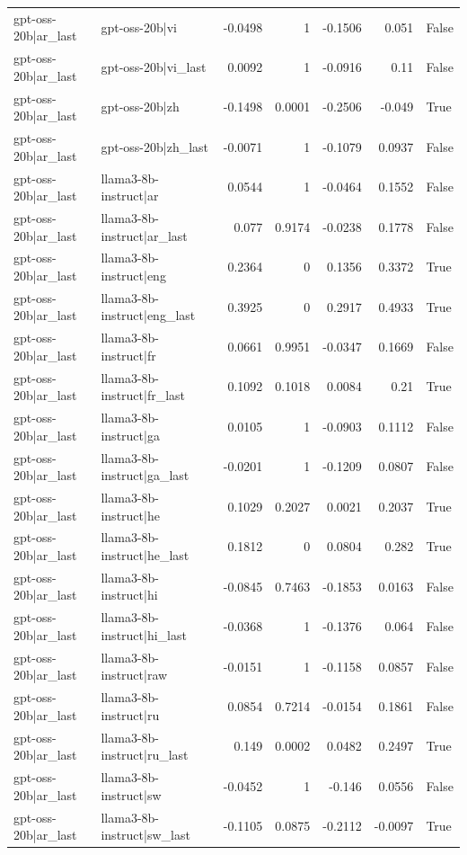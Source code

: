 \begin{table}
\begin{tabular}{l l r r r r l}
gpt-oss-20b|ar_last & gpt-oss-20b|vi & -0.0498 & 1 & -0.1506 & 0.051 & False \\
gpt-oss-20b|ar_last & gpt-oss-20b|vi_last & 0.0092 & 1 & -0.0916 & 0.11 & False \\
gpt-oss-20b|ar_last & gpt-oss-20b|zh & -0.1498 & 0.0001 & -0.2506 & -0.049 & True \\
gpt-oss-20b|ar_last & gpt-oss-20b|zh_last & -0.0071 & 1 & -0.1079 & 0.0937 & False \\
gpt-oss-20b|ar_last & llama3-8b-instruct|ar & 0.0544 & 1 & -0.0464 & 0.1552 & False \\
gpt-oss-20b|ar_last & llama3-8b-instruct|ar_last & 0.077 & 0.9174 & -0.0238 & 0.1778 & False \\
gpt-oss-20b|ar_last & llama3-8b-instruct|eng & 0.2364 & 0 & 0.1356 & 0.3372 & True \\
gpt-oss-20b|ar_last & llama3-8b-instruct|eng_last & 0.3925 & 0 & 0.2917 & 0.4933 & True \\
gpt-oss-20b|ar_last & llama3-8b-instruct|fr & 0.0661 & 0.9951 & -0.0347 & 0.1669 & False \\
gpt-oss-20b|ar_last & llama3-8b-instruct|fr_last & 0.1092 & 0.1018 & 0.0084 & 0.21 & True \\
gpt-oss-20b|ar_last & llama3-8b-instruct|ga & 0.0105 & 1 & -0.0903 & 0.1112 & False \\
gpt-oss-20b|ar_last & llama3-8b-instruct|ga_last & -0.0201 & 1 & -0.1209 & 0.0807 & False \\
gpt-oss-20b|ar_last & llama3-8b-instruct|he & 0.1029 & 0.2027 & 0.0021 & 0.2037 & True \\
gpt-oss-20b|ar_last & llama3-8b-instruct|he_last & 0.1812 & 0 & 0.0804 & 0.282 & True \\
gpt-oss-20b|ar_last & llama3-8b-instruct|hi & -0.0845 & 0.7463 & -0.1853 & 0.0163 & False \\
gpt-oss-20b|ar_last & llama3-8b-instruct|hi_last & -0.0368 & 1 & -0.1376 & 0.064 & False \\
gpt-oss-20b|ar_last & llama3-8b-instruct|raw & -0.0151 & 1 & -0.1158 & 0.0857 & False \\
gpt-oss-20b|ar_last & llama3-8b-instruct|ru & 0.0854 & 0.7214 & -0.0154 & 0.1861 & False \\
gpt-oss-20b|ar_last & llama3-8b-instruct|ru_last & 0.149 & 0.0002 & 0.0482 & 0.2497 & True \\
gpt-oss-20b|ar_last & llama3-8b-instruct|sw & -0.0452 & 1 & -0.146 & 0.0556 & False \\
gpt-oss-20b|ar_last & llama3-8b-instruct|sw_last & -0.1105 & 0.0875 & -0.2112 & -0.0097 & True \\

\end{tabular}
\end{table}
